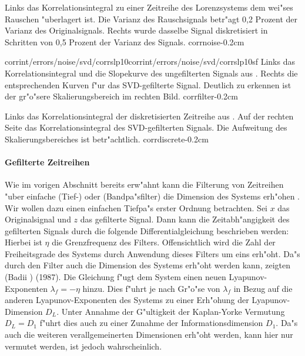 {Links das Korrelationsintegral zu einer Zeitreihe des Lorenzsystems dem wei"ses
Rauschen "uberlagert ist. Die Varianz des Rauschsignals betr"agt 0,2 Prozent der Varianz des
Originalsignals. Rechts wurde dasselbe Signal diskretisiert in Schritten von 0,5 Prozent
der Varianz des Signals.
}{corrnoise}{-0.2cm}

{corrint/errors/noise/svd/corrslp10}{corrint/errors/noise/svd/corrslp10sf}
{Links das Korrelationsintegral und die Slopekurve des ungefilterten Signals aus
. Rechts die entsprechenden Kurven f"ur das SVD-gefilterte
Signal. Deutlich zu erkennen ist der gr"o"sere Skalierungsbereich im rechten Bild.
}{corrfilter}{-0.2cm}

{Links das Korrelationsintegral der diskretisierten Zeitreihe aus . Auf
  der rechten Seite das Korrelationsintegral des SVD-gefilterten Signals. Die Aufweitung des
  Skalierungsbereiches ist betr"achtlich.
}{corrdiscrete}{-0.2cm}

\paragraph{Gefilterte Zeitreihen}
\label{chapcorrdimfiltered}
Wie im vorigen Abschnitt bereits erw"ahnt kann die Filterung von Zeitreihen "uber einfache 
\begriff(Tief-) oder \begriff(Bandpa"sfilter) die Dimension des Systems erh"ohen \cite{Badii-politi}. Wir wollen dazu einen
einfachen Tiefpa"s erster Ordnung betrachten. Sei $x$ das Originalsignal und $z$ das
gefilterte Signal. Dann kann die Zeitabh"angigkeit des gefilterten Signals durch die
folgende Differentialgleichung beschrieben werden:
Hierbei ist $\eta$ die Grenzfrequenz des Filters. Offensichtlich wird die Zahl der
Freiheitsgrade des Systems durch Anwendung dieses Filters um eins erh"oht. Da"s durch den
Filter auch die Dimension des Systems erh"oht werden kann, zeigten \autor(Badii \etal)
(1987). Die Gleichung f"ugt dem System einen neuen Lyapunov-Exponenten
$\lambda_f=-\eta$ hinzu. Dies f"uhrt je nach Gr"o"se von $\lambda_f$ in Bezug auf die
anderen Lyapunov-Exponenten des Systems zu einer Erh"ohung der Lyapunov-Dimension
$D_L$. Unter Annahme der G"ultigkeit der  Kaplan-Yorke Vermutung $D_L=D_1$ f"uhrt dies
auch zu einer Zunahme der Informationsdimension $D_1$. Da"s auch die weiteren
verallgemeinerten Dimensionen erh"oht werden, kann hier nur vermutet werden, ist jedoch
wahrscheinlich.

